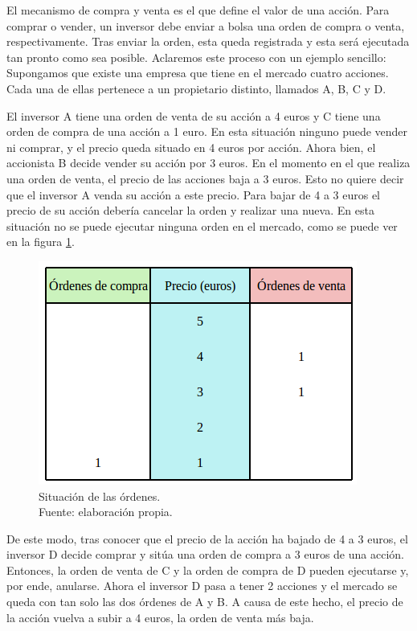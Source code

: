 		El mecanismo de compra y venta es el que define el valor de una acci\'on. Para comprar o vender, un inversor debe enviar a bolsa una orden de compra o venta, respectivamente. Tras enviar la orden, esta queda registrada y esta ser\'a ejecutada tan pronto como sea posible. Aclaremos este proceso con un ejemplo sencillo:\\
		
		Supongamos que existe una empresa que tiene en el mercado cuatro acciones. Cada una de ellas pertenece a un propietario distinto, llamados A, B, C y D. 
		
		El inversor A tiene una orden de venta de su acci\'on a 4 euros y C tiene una orden de compra de una acci\'on a 1 euro. En esta situaci\'on ninguno puede vender ni comprar, y el precio queda situado en 4 euros por acci\'on. Ahora bien, el accionista B decide vender su acci\'on por 3 euros. En el momento en el que realiza una orden de venta, el precio de las acciones baja a 3 euros. Esto no quiere decir que el inversor A venda su acci\'on a este precio. Para bajar de 4 a 3 euros el precio de su acci\'on deber\'ia cancelar la orden y realizar una nueva. En esta situaci\'on no se puede ejecutar ninguna orden en el mercado, como se puede ver en la figura \ref{fig:ordenes_ejemplo}.
		
				\begin{figure}[H]
					\centering
					\includegraphics[scale=2]{imagenes/ordenes_ejemplo.png}
					\caption[Ejemplo de situaci\'on de las \'ordenes]{Situaci\'on de las \'ordenes.\\ Fuente: elaboraci\'on propia.}
					\label{fig:ordenes_ejemplo}
				\end{figure}
		
		
		De este modo, tras conocer que el precio de la acci\'on ha bajado de 4 a 3 euros, el inversor D decide comprar y sit\'ua una orden de compra a 3 euros de una acci\'on. Entonces, la orden de venta de C y la orden de compra de D pueden ejecutarse y, por ende, anularse. Ahora el inversor D pasa a tener 2 acciones y el mercado se queda con tan solo las dos \'ordenes de A y B. A causa de este hecho, el precio de la acci\'on vuelva a subir a 4 euros, la orden de venta m\'as baja.\\
		
